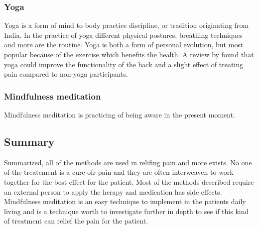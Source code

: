 \subsubsection{Yoga}
Yoga is a form of mind to body practice discipline, or tradition originating from India. In the practice of yoga different physical postures, breathing techniques and more are the routine. 
Yoga is both a form of personal evolution, but most popular because of the exercise which benefits the health.
A review by \cite{Whitehead2017} found that yoga could improve the functionality of the back and a slight effect of treating pain compared to non-yoga participants. 

\subsubsection{Mindfulness meditation}
Mindfulness meditation is practicing of being aware in the present moment. 

\subsection{Summary}
Summarized, all of the methods are used in relifing pain and more exists. No one of the treatement is a cure ofr pain and they are often interweaven to work together for the best effect for the patient. Most of the methods described require an external person to apply the herapy and medication has side effects. Mindfulness meditation is an easy technique to implement in the patients daily living and is a technique worth to investigate further in depth to see if this kind of treatment can relief the pain for the patient. 